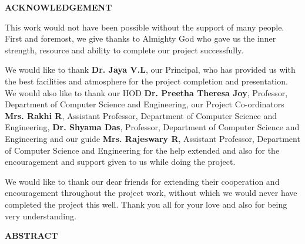 \documentclass[12pt,a4paper,oneside]{report}
\begin{document}
\begin{center}
{\Large\bfseries ACKNOWLEDGEMENT}
\end{center}
\vspace{0.5cm}

This work would not have been possible without the support of many people.
First and foremost, we give thanks to Almighty God who gave us the inner strength,
resource and ability to complete our project successfully.

We would like to thank \textbf{Dr. Jaya V.L}, our Principal, who has provided us with
the best facilities and atmosphere for the project completion and presentation.
We would also like to thank our HOD \textbf{Dr. Preetha Theresa Joy}, Professor, Department of Computer Science and Engineering, our Project Co-ordinators
\textbf{Mrs. Rakhi R}, Assistant Professor, Department of Computer Science and Engineering, \textbf{Dr. Shyama Das}, Professor, Department of Computer Science and Engineering and our guide \textbf{Mrs. Rajeswary R}, Assistant Professor, Department of Computer Science and Engineering for the help extended and also for the encouragement and support given to us while doing the project.

We would like to thank our dear friends for extending their cooperation and encouragement
throughout the project work, without which we would never have completed the project this
well. Thank you all for your love and also for being very understanding.

\clearpage
\thispagestyle{frontmatter}

\begin{center}
{\Large\bfseries ABSTRACT}
\end{center}
\vspace{0.5cm}
\end{document}
